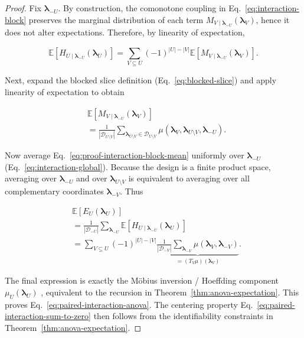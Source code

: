 \begin{proof}
Fix $\boldsymbol{\lambda}_{-U}$. By construction, the comonotone coupling in
Eq.~\eqref{eq:interaction-block} preserves the marginal distribution of each
term $M_{V\mid \boldsymbol{\lambda}_{-U}}(\boldsymbol{\lambda}_V)$, hence it does
not alter expectations. Therefore, by linearity of expectation,

{\small
\begin{equation}
\label{eq:proof-interaction-block-mean}
\mathbb{E}\!\left[H_{U\mid \boldsymbol{\lambda}_{-U}}(\boldsymbol{\lambda}_U)\right]
=
\sum_{V\subseteq U}(-1)^{|U|-|V|}
\mathbb{E}\!\left[M_{V\mid \boldsymbol{\lambda}_{-U}}(\boldsymbol{\lambda}_V)\right].
\end{equation}
}

Next, expand the blocked slice definition (Eq.~\eqref{eq:blocked-slice}) and
apply linearity of expectation to obtain

\begin{align}
&\mathbb{E}\!\left[M_{V\mid \boldsymbol{\lambda}_{-U}}(\boldsymbol{\lambda}_V)\right] \\
&=
\frac{1}{|\mathcal{D}_{U\setminus V}|}
\sum_{\boldsymbol{\lambda}_{U\setminus V}\in\mathcal{D}_{U\setminus V}}
\mu(\boldsymbol{\lambda}_V,\boldsymbol{\lambda}_{U\setminus V},\boldsymbol{\lambda}_{-U}).  
\end{align}

Now average Eq.~\eqref{eq:proof-interaction-block-mean} uniformly over
$\boldsymbol{\lambda}_{-U}$ (Eq.~\eqref{eq:interaction-global}). Because the
design is a finite product space, averaging over $\boldsymbol{\lambda}_{-U}$
and over $\boldsymbol{\lambda}_{U\setminus V}$ is equivalent to averaging over
all complementary coordinates $\boldsymbol{\lambda}_{-V}$. Thus

\begin{align}
&\mathbb{E}\!\left[E_U(\boldsymbol{\lambda}_U)\right] \\
&=
\frac{1}{|\mathcal{D}_{-U}|}
\sum_{\boldsymbol{\lambda}_{-U}}
\mathbb{E}\!\left[H_{U\mid \boldsymbol{\lambda}_{-U}}(\boldsymbol{\lambda}_U)\right]\\
&=
\sum_{V\subseteq U}(-1)^{|U|-|V|}
\underbrace{
\frac{1}{|\mathcal{D}_{-V}|}
\sum_{\boldsymbol{\lambda}_{-V}}
\mu(\boldsymbol{\lambda}_V,\boldsymbol{\lambda}_{-V})
}_{=(T_V\mu)(\boldsymbol{\lambda}_V)}.
\end{align}

The final expression is exactly the M\"obius inversion / Hoeffding component
$\mu_U(\boldsymbol{\lambda}_U)$ \citep{rota1964foundations}, equivalent to the recursion in
Theorem~\ref{thm:anova-expectation}.
This proves Eq.~\eqref{eq:paired-interaction-anova}. The centering property
Eq.~\eqref{eq:paired-interaction-sum-to-zero} then follows from the
identifiability constraints in Theorem~\ref{thm:anova-expectation}.
\end{proof}



